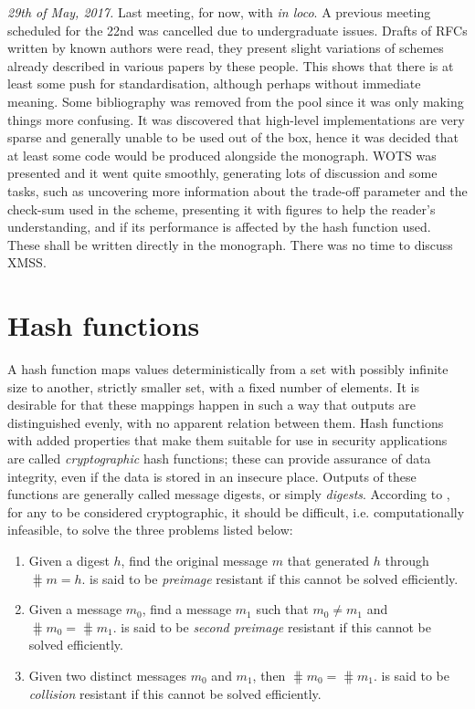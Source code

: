 \emph{29th of May, 2017.} Last meeting, for now, with \dan{} \emph{in loco}. A
previous meeting scheduled for the 22nd was cancelled due to undergraduate
issues. Drafts of RFCs written by known authors were read, they present slight
variations of schemes already described in various papers by these people.
This shows that there is at least some push for standardisation, although
perhaps without immediate meaning. Some bibliography was removed from the pool
since it was only making things more confusing. It was discovered that
high-level implementations are very sparse and generally unable to be used out
of the box, hence it was decided that at least some code would be produced
alongside the monograph. WOTS was presented and it went quite smoothly,
generating lots of discussion and some tasks, such as uncovering more
information about the trade-off parameter and the check-sum used in the scheme,
presenting it with figures to help the reader's understanding, and if its
performance is affected by the hash function used. These shall be written
directly in the monograph. There was no time to discuss XMSS.

\section*{Hash functions}

A hash function \hh{} maps values deterministically from a set with possibly
infinite size to another, strictly smaller set, with a fixed number of
elements. It is desirable for \hh{} that these mappings happen in such a way
that outputs are distinguished evenly, with no apparent relation between them.
Hash functions with added properties that make them suitable for use in
security applications are called \emph{cryptographic} hash functions;
these can provide assurance of data integrity, even if the data is stored
in an insecure place. Outputs of these functions are generally called
message digests, or simply \emph{digests}. According to
\cite{stinson2005cryptography}, for any \hh{} to be considered
cryptographic, it should be difficult, i.e. computationally infeasible,
to solve the three problems listed below:

\begin{enumerate}[label=\roman*.]
    \item Given a digest $h$, find the original
    message $m$ that generated $h$ through $\hash{m} = h$.
    \hh{} is said to be \emph{preimage} resistant if this cannot be solved efficiently.
    \item Given a message $m_0$, find a message
    $m_1$ such that $m_0 \neq m_1$ and $\hash{m_0} = \hash{m_1}$.
    \hh{} is said to be \emph{second preimage} resistant if this cannot
    be solved efficiently.
    \item Given two distinct messages $m_0$ and $m_1$, then $\hash{m_0} = \hash{m_1}$.
    \hh{} is said to be \emph{collision} resistant if this cannot be
    solved efficiently.
\end{enumerate}

